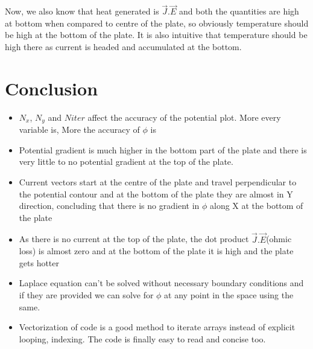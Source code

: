 \documentclass[12pt, a4paper]{report}
\begin{document}
\hfill \break
Now, we also know that heat generated is $\vec{J}.\vec{E}$ and both the quantities are high at bottom when compared to centre of the plate, so obviously temperature should be high at the bottom of the plate. It is also intuitive that temperature should be high there as current is headed and accumulated at the bottom.

\section*{Conclusion}
\begin{itemize}
	\item$N_x$, $N_y$ and $Niter$ affect the accuracy of the potential plot. More every variable is, More the accuracy of $\phi$ is 
	\item Potential gradient is much higher in the bottom part of the plate and there is very little to no potential gradient at the top of the plate.
	\item Current vectors start at the centre of the plate and travel perpendicular to the potential contour and at the bottom of the plate they are almost in Y direction, concluding that there is no gradient in $\phi$ along X at the bottom of the plate
	\item As there is no current at the top of the plate, the dot product $\vec{J}.\vec{E}$(ohmic loss) is almost zero and at the bottom of the plate it is high and the plate gets hotter
	\item Laplace equation can't be solved without necessary boundary conditions and if they are provided we can solve for $\phi$ at any point in the space using the same.
	\item Vectorization of code is a good method to iterate arrays instead of explicit looping, indexing. The code is finally easy to read and concise too.
	
\end{itemize}
\end{document}
